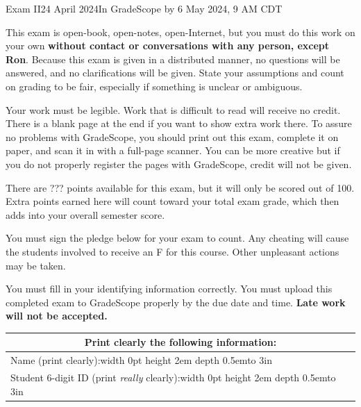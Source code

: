 \documentclass[12pt]{article}
\def\Tall{\vrule width 0pt height 2em depth 0.5em}
\begin{document}
\def\TensOp{\ensuremath{\bm{\otimes}}}
\def\TensProd#1#2{\ensuremath{#1 \TensOp{} #2}}
\def\RootN#1{\RootUN{1}{#1}}
\def\RootUN#1#2{\ensuremath{\frac{#1}{\sqrt{#2}}}}
\def\RootTwo{\RootN{2}}
\def\ExpVal#1#2{\ensuremath{\bra{#2}#1\ket{#2}}}

\begin{assignment}{Exam II}{24 April 2024}{In GradeScope by 6 May 2024, 9 AM CDT}

{\small {\large {}}
This exam is open-book, open-notes, open-Internet, but you must do this
work on your own \textbf{without contact or conversations with any person, except Ron}.  
Because this exam is given in a distributed manner, no questions will be answered, and no clarifications will be given.  State your assumptions and count on grading to be fair, especially if something is unclear or ambiguous.


Your work must be legible.  Work that is
difficult to read will receive no credit.  There is a blank page at the end
if you want to show extra work there.  To assure no problems with GradeScope,
you should
print out this exam, complete it on paper, and scan it in with a full-page
scanner.  You can be more creative but if you do not properly register the
pages with GradeScope, credit will not be given.

There are ??? points available for this exam, but it will only be scored out of 100.  Extra points earned here will count toward your total exam grade, which then adds into your overall semester score.

You must sign the pledge below for your exam to count.  Any cheating will
cause the students involved to receive an F for this course. Other unpleasant
actions
may be taken.

You must fill in your identifying information correctly.  You must upload this
completed exam to GradeScope properly by the due date and time.  \textbf{Late work will not be accepted.}
}

\begin{center}\large
\begin{tabular}{|c|c|c|} \hline
\multicolumn{3}{|c|}{{\bf Print  clearly} the following information:}  \\ \hline
\multicolumn{3}{|l|}{Name (print clearly):\Tall{}\hbox to 3in{\hss}}  \\ \hline
\multicolumn{3}{|l|}{Student 6-digit ID (print {\it really} clearly):\Tall{}\hbox to 3in{\hss}} \\ \hline
\end{tabular}
\end{center}


\end{assignment}
\end{document}
